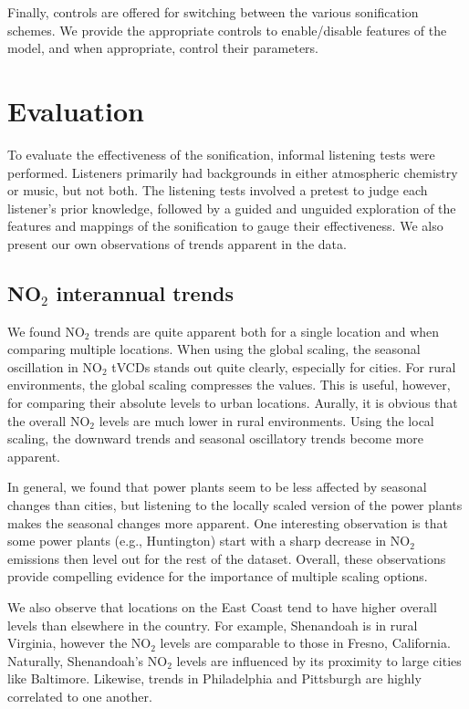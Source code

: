 \documentclass[a4paper,10pt,oneside]{article}
\newcommand{\ce}[1]{$\mathrm{#1}$}
\begin{document}
\begin{sloppy}
Finally, controls are offered for switching between the various sonification schemes. We provide the appropriate controls to enable/disable features of the model, and when appropriate, control their parameters.  

\section{Evaluation}

To evaluate the effectiveness of the sonification, informal listening tests were performed. Listeners primarily had backgrounds in either atmospheric chemistry or music, but not both. The listening tests involved a pretest to judge each listener's prior knowledge, followed by a guided and unguided exploration of the features and mappings of the sonification to gauge their effectiveness.  We also present our own observations of trends apparent in the data.

\subsection{NO$_2$ interannual trends}\label{sec:nox-trends-listening}
We found \ce{NO_2} trends are quite apparent both for a single location and when comparing multiple locations.  When using the global scaling, the seasonal oscillation in \ce{NO_2} tVCDs stands out quite clearly, especially for cities. For rural environments, the global scaling compresses the values.  This is useful, however, for comparing their absolute levels to urban locations.  Aurally, it is obvious that the overall \ce{NO_2} levels are much lower in rural environments. Using the local scaling, the downward trends and seasonal oscillatory trends become more apparent. 

In general, we found that power plants seem to be less affected by seasonal changes than cities, but listening to the locally scaled version of the power plants makes the seasonal changes more apparent. One interesting observation is that some power plants (e.g., Huntington) start with a sharp decrease in \ce{NO_2} emissions then level out for the rest of the dataset. Overall, these observations provide compelling evidence for the importance of multiple scaling options.  

We also observe that locations on the East Coast tend to have higher overall levels than elsewhere in the country.  For example, Shenandoah is in rural Virginia, however the \ce{NO_2} levels are comparable to those in Fresno, California.  Naturally, Shenandoah's  \ce{NO_2} levels are influenced by its proximity to large cities like Baltimore. Likewise, trends in Philadelphia and Pittsburgh are highly correlated to one another.


\end{sloppy}
\end{document}
